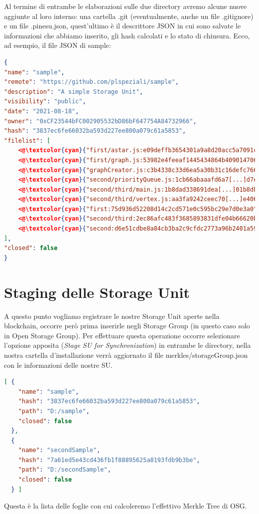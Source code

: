 Al termine di entrambe le elaborazioni sulle due directory avremo alcune nuove aggiunte al loro interno:
una cartella \textsf{.git} (eventualmente, anche un file \textsf{.gitignore}) e un file \textsf{.pinesu.json}, quest'ultimo è
il descrittore JSON in cui sono salvate le informazioni che abbiamo inserito, gli hash calcolati e
lo stato di chiusura. Ecco, ad esempio, il file JSON di \textsf{sample}:

\singlespacing
\begin{lstlisting}[language=json,firstnumber=1]
{
"name": "sample",
"remote": "https://github.com/plspeziali/sample",
"description": "A simple Storage Unit",
"visibility": "public",
"date": "2021-08-18",
"owner": "0xCF23544bFC002905532bD86bF647754A84732966",
"hash": "3837ec6fe66032ba593d227ee800a079c61a5853",
"filelist": [
    <@\textcolor{cyan}{"first/astar.js:e09deffb3654301a9a8d20acc5a7091cda7039b6"}@>,
    <@\textcolor{cyan}{"first/graph.js:53982e4feeaf1445434864b409014706e31da1cc"}@>,
    <@\textcolor{cyan}{"graphCreator.js:c3b4338c33d6ea5a30b31c16defc7661a4ae767b"}@>,
    <@\textcolor{cyan}{"second/priorityQueue.js:1cb66abaaafd6a7[...]d7e0fb1860da574"}@>,
    <@\textcolor{cyan}{"second/third/main.js:1b8dad338691dea[...]01b8db6d834e3d8"}@>,
    <@\textcolor{cyan}{"second/third/vertex.js:aa3fa9242ceec70[...]e4068711e53c4e3"}@>,
    <@\textcolor{cyan}{"first:75d936d52208d14c2cd571e0c595bc29e7d0e3a0"}@>,
    <@\textcolor{cyan}{"second/third:2ec86afc483f3685893831dfe04b66620be690d2"}@>,
    <@\textcolor{cyan}{"second:d6e51cdbe8a84cb3ba2c9cfdc2773a96b2401a59"}@>
],
"closed": false
}
\end{lstlisting}
\newpage
\onehalfspacing

\section{Staging delle Storage Unit}

A questo punto vogliamo registrare le nostre Storage Unit aperte nella blockchain, 
occorre però prima inserirle negli Storage Group
(in questo caso solo in Open Storage Group).
Per effettuare questa operazione occorre selezionare l'opzione apposita (\emph{Stage SU for Synchronization})
in entrambe le directory, nella nostra cartella d'installazione verrà 
aggiornato il file \textsf{merkles/storageGroup.json} con le informazioni delle nostre SU.

\singlespacing
\begin{lstlisting}[language=json,firstnumber=1]
[ {
    "name": "sample",
    "hash": "3837ec6fe66032ba593d227ee800a079c61a5853",
    "path": "D:/sample",
    "closed": false
  },
  {
    "name": "secondSample",
    "hash": "7a61ed5e43cd436fb1f88895625a8193fdb9b3be",
    "path": "D:/secondSample",
    "closed": false
  } ]  
\end{lstlisting}
\onehalfspacing
Questa è la lista delle foglie con cui calcoleremo l'effettivo Merkle Tree di OSG.

